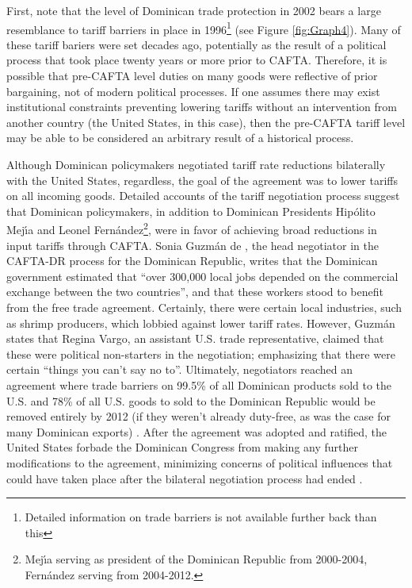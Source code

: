 \documentclass[12pt]{article}
\begin{document}
First, note that the level of Dominican trade protection in 2002 bears a large resemblance
to tariff barriers in place in 1996\footnote{Detailed
information on trade barriers is not available further back than this} (see Figure \ref{fig:Graph4}).
Many of these tariff bariers were set decades ago, potentially as the result of a political process
that took place twenty years or more prior to CAFTA. Therefore, it is possible that pre-CAFTA level 
duties on many goods were reflective of prior bargaining, not of modern political processes.
If one assumes there may exist institutional constraints preventing lowering tariffs without an 
intervention from another country (the United States, in this case), then the pre-CAFTA tariff
level may be able to be considered an arbitrary result of a historical process. 

Although Dominican policymakers negotiated tariff rate reductions bilaterally with the
United States, regardless, the goal of the agreement was to lower tariffs on all
incoming goods. Detailed accounts of the tariff negotiation process suggest that Dominican policymakers,
in addition to Dominican Presidents Hip\'{o}lito Mej\'{\i}a and Leonel Fern\'{a}ndez\footnote{Mej\'{\i}a
serving as president of the Dominican Republic from 2000-2004, Fern\'{a}ndez serving from 2004-2012.},
were in favor of achieving broad reductions in input tariffs through CAFTA. Sonia Guzm\'{a}n de 
\citeauthor{guzman}, 
the head negotiator in the CAFTA-DR process for the Dominican Republic, writes that the Dominican 
government estimated that ``over 300,000 local jobs depended
on the commercial exchange between the two countries'', and that these workers stood to benefit from the 
free trade agreement. Certainly, there were certain local industries, such as shrimp producers,
which lobbied against lower tariff rates. However, Guzm\'{a}n states that Regina Vargo, an 
assistant U.S. trade representative, claimed that these were political non-starters in the negotiation;
emphasizing that there were certain ``things you can't say no to''. Ultimately,
negotiators reached an agreement where trade barriers on 99.5\% of all Dominican products sold to 
the U.S. and 78\% of all U.S. goods to sold to the Dominican Republic would be removed entirely by 2012
(if they weren't already duty-free, as was the case for many Dominican exports) \citep{guzman}. 
After the agreement was adopted and ratified, the United States
forbade the Dominican Congress from making any further modifications to the agreement, 
minimizing concerns of political influences that could have taken place after the bilateral
negotiation process had ended \citep{usambassador}.
\end{document}
